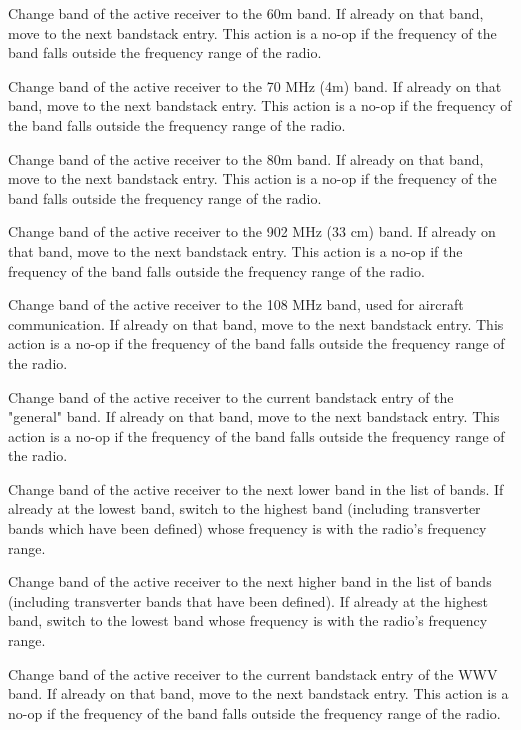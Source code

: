 \documentclass[12pt]{book}
\begin{document}
{Change band of the active receiver to the 60m band. If already on that band, move to
the next bandstack entry. This action is a no-op if the frequency of the band falls outside the frequency 
range of the radio.}

{Change band of the active receiver to the 70 MHz (4m)  band. If already on that band, move to
the next bandstack entry. This action is a no-op if the frequency of the band falls outside the frequency 
range of the radio.}

{Change band of the active receiver to the 80m band. If already on that band, move to
the next bandstack entry. This action is a no-op if the frequency of the band falls outside the frequency 
range of the radio.}

{Change band of the active receiver to the 902 MHz (33 cm) band. If already on that band, move to
the next bandstack entry. This action is a no-op if the frequency of the band falls outside the frequency 
range of the radio.}

{Change band of the active receiver to the 108 MHz band, used for aircraft communication. If already on that 
band, move to
the next bandstack entry. This action is a no-op if the frequency of the band falls outside the frequency 
range of the radio.} 

{Change band of the active receiver to the current bandstack entry of the "general" band. If already on that 
band, move to
the next bandstack entry. This action is a no-op if the frequency of the band falls outside the frequency 
range of the radio.}

{Change band of the active receiver to the next lower band in the list of bands. If already at the lowest
band, switch to the highest band (including transverter bands which have been defined) whose frequency is 
with the radio's frequency range.}

{Change band of the active receiver to the next higher band in the list of bands (including transverter 
bands that have been defined). If already at the highest band, switch to the lowest band whose frequency is 
with the radio's frequency range.}

{Change band of the active receiver to the current bandstack entry of the WWV band. If already on that band, 
move to the next bandstack entry. This action is a no-op if the frequency of the band falls outside the 
frequency range of the radio.}
\end{document}
